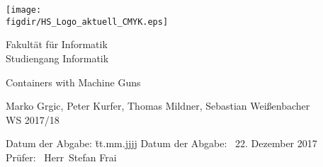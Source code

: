 \begin{titlepage}

\raggedleft

\vspace*{-2cm}

\texttt{[image: \\figdir/HS\_Logo\_aktuell\_CMYK.eps]}

\vfill

\centering
\LARGE
Fakultät für Informatik  \vspace{0.5cm}\\
\Large
Studiengang Informatik

\vspace{2cm}

\LARGE

Containers with Machine Guns
\vspace{2cm}

\Large
Marko Grgic, Peter Kurfer, Thomas Mildner, Sebastian Weißenbacher\\
WS 2017/18

\vspace{1.5cm}

\vspace{1cm}

\flushleft
 \Large
\vspace*{\fill}

\begin{tabbing}
Datum der Abgabe: \= tt.mm.jjjj \kill
Datum der Abgabe: \> \ 22. Dezember 2017 \\
Prüfer: \> \ Herr\ Stefan Frai\\
\end{tabbing}

\end{titlepage}

\cleardoubleemptypage

